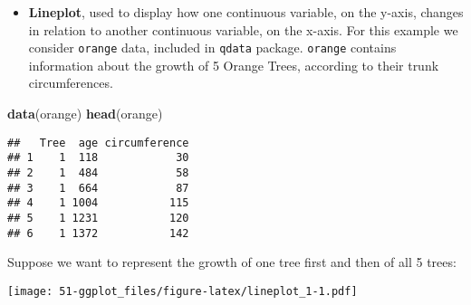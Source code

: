 \documentclass[]{book}
\newenvironment{Shaded}{\begin{snugshade}}{\end{snugshade}}
\newcommand{\KeywordTok}[1]{\textcolor[rgb]{0.13,0.29,0.53}{\textbf{{#1}}}}
\newcommand{\DataTypeTok}[1]{\textcolor[rgb]{0.13,0.29,0.53}{{#1}}}
\newcommand{\DecValTok}[1]{\textcolor[rgb]{0.00,0.00,0.81}{{#1}}}
\newcommand{\FloatTok}[1]{\textcolor[rgb]{0.00,0.00,0.81}{{#1}}}
\newcommand{\StringTok}[1]{\textcolor[rgb]{0.31,0.60,0.02}{{#1}}}
\newcommand{\CommentTok}[1]{\textcolor[rgb]{0.56,0.35,0.01}{\textit{{#1}}}}
\newcommand{\NormalTok}[1]{{#1}}
\providecommand{\tightlist}{%
  \setlength{\itemsep}{0pt}\setlength{\parskip}{0pt}}
\def\tightlist{}
\begin{document}
\clearpage

\begin{itemize}
\tightlist
\item
  \textbf{Lineplot}, used to display how one continuous variable, on the
  y-axis, changes in relation to another continuous variable, on the
  x-axis. For this example we consider \texttt{orange} data, included in
  \texttt{qdata} package. \texttt{orange} contains information about the
  growth of 5 Orange Trees, according to their trunk circumferences.
\end{itemize}

\begin{Shaded}
\begin{Highlighting}[]
\KeywordTok{data}\NormalTok{(orange)}
\KeywordTok{head}\NormalTok{(orange)}
\end{Highlighting}
\end{Shaded}

\begin{verbatim}
##   Tree  age circumference
## 1    1  118            30
## 2    1  484            58
## 3    1  664            87
## 4    1 1004           115
## 5    1 1231           120
## 6    1 1372           142
\end{verbatim}

Suppose we want to represent the growth of one tree first and then of
all 5 trees:

\begin{Shaded}
\end{Shaded}

\texttt{[image: 51-ggplot\_files/figure-latex/lineplot\_1-1.pdf]}

\clearpage
\end{document}
